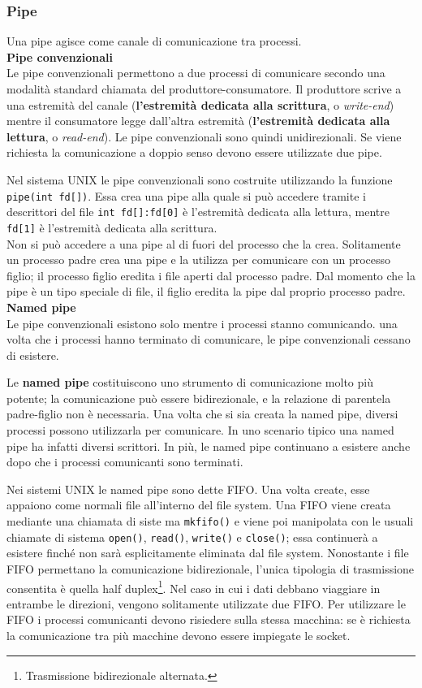 \documentclass[11pt,a4paper]{article}
\begin{document}
\subsubsection{Pipe}
Una pipe agisce come canale di comunicazione tra processi.\medskip\\
%
\textbf{Pipe convenzionali}\\
Le pipe convenzionali permettono a due processi di comunicare secondo una modalità standard chiamata del produttore-consumatore. Il produttore scrive a una estremità del canale
(\textbf{l'estremità dedicata alla scrittura}, o \emph{write-end}) mentre il consumatore legge dall'altra estre­mità (\textbf{l'estremità dedicata alla lettura}, o \emph{read-end}). Le pipe convenzionali sono quindi unidirezionali. Se viene richiesta la comunicazione a doppio senso devono essere utilizzate due pipe.

Nel sistema UNIX le pipe convenzionali sono costruite utilizzando la funzione \texttt{pipe(int fd[])}.
Essa crea una pipe alla quale si può accedere tramite i descrittori del file \texttt{int fd[]:fd[0]}
è l'estremità dedicata alla lettura, mentre \texttt{fd[1]} è l'estremità dedicata alla scrittura.\\
Non si può accedere a una pipe al di fuori del processo che la crea. Solitamente un pro­cesso padre crea una pipe e la utilizza per comunicare con un processo figlio;
il processo figlio eredita i file
aperti dal processo padre. Dal momento che la pipe è un tipo speciale di file, il figlio eredi­ta la pipe dal proprio processo padre.\medskip\\
%
\textbf{Named pipe}\\
Le pipe convenzionali esistono solo mentre i processi stanno comunican­do. una volta che i processi hanno terminato di comunicare, le
pipe convenzionali cessano di esistere.

Le \textbf{named pipe} costituiscono uno strumento di comunicazione molto più potente; la
comunicazione può essere bidirezionale, e la relazione di parentela padre-figlio non è neces­saria. Una volta che si sia creata la named pipe, diversi processi possono utilizzarla per co­municare. In uno scenario tipico una named pipe ha infatti diversi scrittori. In più, le na­med pipe continuano a esistere anche dopo che i processi comunicanti sono terminati.

Nei sistemi UNIX le named pipe sono dette FIFO. Una volta create, esse appaiono come
normali file all'interno del file system. Una FIFO viene creata mediante una chiamata di siste­
ma \texttt{mkfifo()} e viene poi manipolata con le usuali chiamate di sistema \texttt{open()}, \texttt{read()}, \texttt{write()} e \texttt{close()}; essa continuerà a esistere finché non sarà esplicitamente eliminata dal
file system. Nonostante i file FIFO permettano la comunicazione bidirezionale, l'unica tipolo­gia di trasmissione consentita è quella half duplex\footnote{Trasmissione bidirezionale alternata.}. Nel caso in cui i dati debbano viaggiare in
entrambe le direzioni, vengono solitamente utilizzate due FIFO. Per utilizzare le FIFO i pro­cessi comunicanti devono risiedere sulla stessa macchina: se è richiesta la comunicazione tra
più macchine devono essere impiegate le socket.
\end{document}
